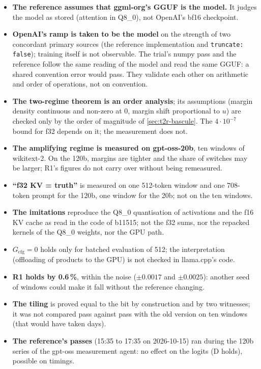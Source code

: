 \begin{faux}
\begin{itemize}
\item \textbf{The reference assumes that ggml-org's GGUF is the model.} It judges the model as stored (attention in Q8\_0), not OpenAI's bf16 checkpoint.
\item \textbf{OpenAI's ramp is taken to be the model} on the strength of two concordant primary sources (the reference implementation and \texttt{truncate: false}); training itself is not observable. The trial's numpy pass and the reference follow the same reading of the model and read the same GGUF: a shared convention error would pass. They validate each other on arithmetic and order of operations, not on convention.
\item \textbf{The two-regime theorem is an order analysis}; its assumptions (margin density continuous and non-zero at 0, margin shift proportional to $u$) are checked only by the order of magnitude of \cref{sec:t2r-bascule}. The $4\cdot10^{-7}$ bound for f32 depends on it; the measurement does not.
\item \textbf{The amplifying regime is measured on gpt-oss-20b}, ten windows of wikitext-2. On the 120b, margins are tighter and the share of switches may be larger; R1's figures do not carry over without being remeasured.
\item \textbf{\enquote{f32 KV = truth}} is measured on one 512-token window and one 708-token prompt for the 120b, one window for the 20b; not on the ten windows.
\item \textbf{The imitations} reproduce the Q8\_0 quantisation of activations and the f16 KV cache as read in the code of b11515; not the f32 sums, nor the repacked kernels of the Q8\_0 weights, nor the GPU path.
\item \textbf{$G_{\text{cfg}} = 0$} holds only for batched evaluation of 512; the interpretation (offloading of products to the GPU) is not checked in llama.cpp's code.
\item \textbf{R1 holds by 0.6\,\%}, within the noise ($\pm0.0017$ and $\pm0.0025$): another seed of windows could make it fall without the reference changing.
\item \textbf{The tiling} is proved equal to the bit by construction and by two witnesses; it was not compared pass against pass with the old version on ten windows (that would have taken days).
\item \textbf{The reference's passes} (15:35 to 17:35 on 2026-10-15) ran during the 120b series of the gpt-oss measurement agent: no effect on the logits (D holds), possible on timings.
\end{itemize}
\end{faux}
